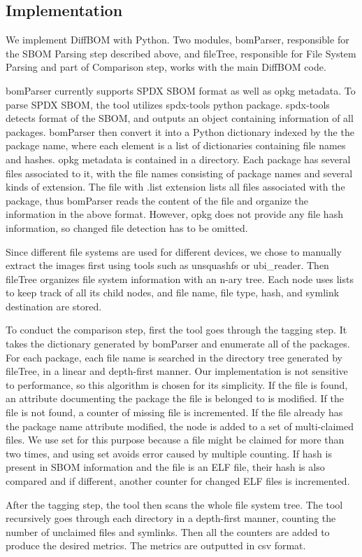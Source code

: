 \subsection{Implementation}
We implement DiffBOM with Python. Two modules, bomParser, responsible for the SBOM Parsing step described above, and fileTree, responsible for File System Parsing and part of Comparison step, works with the main DiffBOM code.\par
bomParser currently supports SPDX SBOM format as well as opkg metadata. To parse SPDX SBOM, the tool utilizes spdx-tools python package. spdx-tools detects format of the SBOM, and outputs an object containing information of all packages. bomParser then convert it into a Python dictionary indexed by the the package name, where each element is a list of dictionaries containing file names and hashes. opkg metadata is contained in a directory. Each package has several files associated to it, with the file names consisting of package names and several kinds of extension. The file with .list extension lists all files associated with the package, thus bomParser reads the content of the file and organize the information in the above format. However, opkg does not provide any file hash information, so changed file detection has to be omitted.\par
Since different file systems are used for different devices, we chose to manually extract the images first using tools such as unsquashfs or ubi\_reader. Then fileTree organizes file system information with an n-ary tree. Each node uses lists to keep track of all its child nodes, and file name, file type, hash, and symlink destination are stored.\par
To conduct the comparison step, first the tool goes through the tagging step. It takes the dictionary generated by bomParser and enumerate all of the packages. For each package, each file name is searched in the directory tree generated by fileTree, in a linear and depth-first manner. Our implementation is not sensitive to performance, so this algorithm is chosen for its simplicity. If the file is found, an attribute documenting the package the file is belonged to is modified. If the file is not found, a counter of missing file is incremented. If the file already has the package name attribute modified, the node is added to a set of multi-claimed files. We use set for this purpose because a file might be claimed for more than two times, and using set avoids error caused by multiple counting. If hash is present in SBOM information and the file is an ELF file, their hash is also compared and if different, another counter for changed ELF files is incremented.\par
After the tagging step, the tool then scans the whole file system tree. The tool recursively goes through each directory in a depth-first manner, counting the number of unclaimed files and symlinks. Then all the counters are added to produce the desired metrics. The metrics are outputted in csv format.

